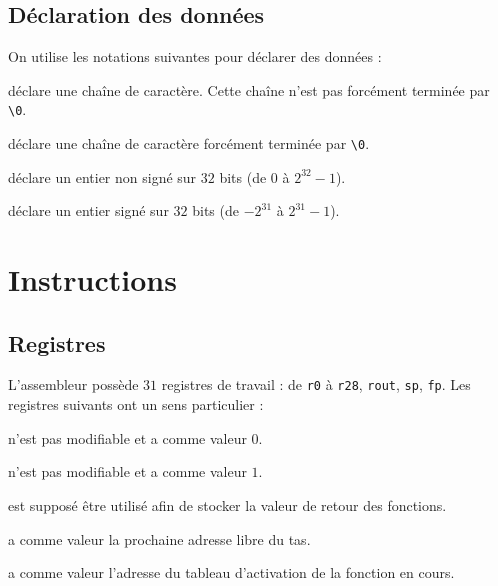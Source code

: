 \documentclass[french, 12pt]{article}
\begin{document}
\subsection*{Déclaration des données}

On utilise les notations suivantes pour déclarer des données :
\begin{description}[format=\normalfont, leftmargin=!, labelwidth=\widthof{\textbf{\texttt{.string}} \textit{text}}]
      \item[\textbf{\texttt{.ascii}} \textit{text}] déclare une chaîne de caractère.
            Cette chaîne n'est pas forcément terminée par \verb|\0|.
      \item[\textbf{\texttt{.string}} \textit{text}] déclare une chaîne de caractère forcément
            terminée par \verb|\0|.
      \item[\textbf{\texttt{.uint}}] déclare un entier non signé sur $32$ bits (de $0$ à $2^{32}-1$).
      \item[\textbf{\texttt{.int}}] déclare un entier signé sur $32$ bits (de $-2^{31}$ à $2^{31}-1$).
\end{description}

\section*{Instructions}

\subsection*{Registres}

L'assembleur possède $31$ registres de travail : de \texttt{r0} à \texttt{r28},
\texttt{rout}, \texttt{sp}, \texttt{fp}. Les registres suivants ont un sens
particulier :

\begin{description}[leftmargin=!, labelwidth=\widthof{\bf \texttt{rout}}]
      \item[\texttt{r0}] n'est pas modifiable et a comme valeur $0$.
      \item[\texttt{r1}] n'est pas modifiable et a comme valeur $1$.
      \item[\texttt{rout}] est supposé être utilisé afin de stocker la valeur de retour des fonctions.
      \item[\texttt{sp}] a comme valeur la prochaine adresse libre du tas.
      \item[\texttt{fp}] a comme valeur l'adresse du tableau d'activation de la fonction en cours.
\end{description}
\end{document}
